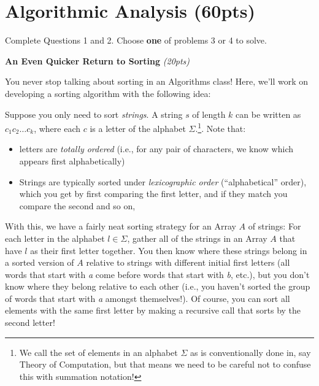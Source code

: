 \documentclass{exam}
\begin{document}
\section{Algorithmic Analysis (60pts)}
Complete Questions 1 and 2. Choose \textbf{one} of problems 3 or 4 to solve. 
\begin{questions}
    \question \textbf{An Even Quicker Return to Sorting} \textit{(20pts)}
    
    You never stop talking about sorting in an Algorithms class! Here, we'll work on developing a sorting algorithm with the following idea:

    Suppose you only need to sort \textit{strings}. A string $s$ of length $k$ can be written as $c_1c_2 \dots c_k$, where each $c$ is a letter of the alphabet $\Sigma$.\footnote{We call the set of elements in an alphabet $\Sigma$ as is conventionally done in, say Theory of Computation, but that means we need to be careful not to confuse this with summation notation!}. Note that: 
    \begin{itemize}
        \item letters are \textit{totally ordered} (i.e., for any pair of characters, we know which appears first alphabetically)
        \item Strings are typically sorted under \textit{lexicographic order} (``alphabetical'' order), which you get by first comparing the first letter, and if they match you compare the second and so on,
    \end{itemize}
    With this, we have a fairly neat sorting strategy for an Array $A$ of strings: For each letter in the alphabet $l \in \Sigma$, gather all of the strings in an Array $A$ that have $l$ as their first letter together. You then know where these strings belong in a sorted version of $A$ relative to strings with different initial first letters (all words that start with \textit{a} come before words that start with \textit{b}, etc.), but you don't know where they belong relative to each other (i.e., you haven't sorted the group of words that start with \textit{a} amongst themselves!). Of course, you can sort all elements with the same first letter by making a recursive call that sorts by the second letter!

    \begin{parts}

\end{parts}
\end{questions}
\end{document}

